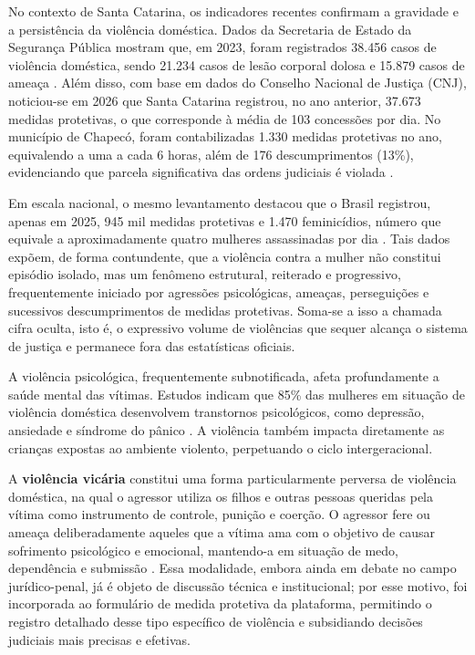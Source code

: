 \par No contexto de Santa Catarina, os indicadores recentes confirmam a gravidade e a persistência da violência doméstica. Dados da Secretaria de Estado da Segurança Pública mostram que, em 2023, foram registrados 38.456 casos de violência doméstica, sendo 21.234 casos de lesão corporal dolosa e 15.879 casos de ameaça \cite{ssp_sc2024}. Além disso, com base em dados do Conselho Nacional de Justiça (CNJ), noticiou-se em 2026 que Santa Catarina registrou, no ano anterior, 37.673 medidas protetivas, o que corresponde à média de 103 concessões por dia. No município de Chapecó, foram contabilizadas 1.330 medidas protetivas no ano, equivalendo a uma a cada 6 horas, além de 176 descumprimentos (13\%), evidenciando que parcela significativa das ordens judiciais é violada \cite{pjsc_domestica:2026}.

\par Em escala nacional, o mesmo levantamento destacou que o Brasil registrou, apenas em 2025, 945 mil medidas protetivas e 1.470 feminicídios, número que equivale a aproximadamente quatro mulheres assassinadas por dia \cite{pjsc_domestica:2026}. Tais dados expõem, de forma contundente, que a violência contra a mulher não constitui episódio isolado, mas um fenômeno estrutural, reiterado e progressivo, frequentemente iniciado por agressões psicológicas, ameaças, perseguições e sucessivos descumprimentos de medidas protetivas. Soma-se a isso a chamada cifra oculta, isto é, o expressivo volume de violências que sequer alcança o sistema de justiça e permanece fora das estatísticas oficiais.


\par A violência psicológica, frequentemente subnotificada, afeta profundamente a saúde mental das vítimas. Estudos indicam que 85\% das mulheres em situação de violência doméstica desenvolvem transtornos psicológicos, como depressão, ansiedade e síndrome do pânico \cite{zancan2013}. A violência também impacta diretamente as crianças expostas ao ambiente violento, perpetuando o ciclo intergeracional.

\par A \textbf{violência vicária} constitui uma forma particularmente perversa de violência doméstica, na qual o agressor utiliza os filhos e outras pessoas queridas pela vítima como instrumento de controle, punição e coerção. O agressor fere ou ameaça deliberadamente aqueles que a vítima ama com o objetivo de causar sofrimento psicológico e emocional, mantendo-a em situação de medo, dependência e submissão \cite{dp2026}. Essa modalidade, embora ainda em debate no campo jurídico-penal, já é objeto de discussão técnica e institucional; por esse motivo, foi incorporada ao formulário de medida protetiva da plataforma, permitindo o registro detalhado desse tipo específico de violência e subsidiando decisões judiciais mais precisas e efetivas.


